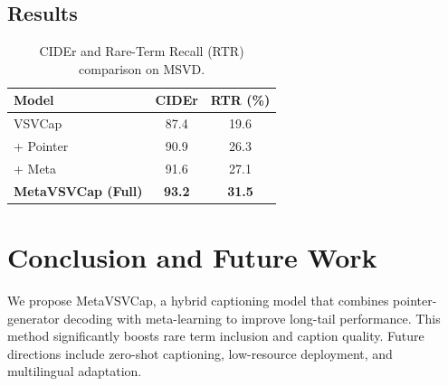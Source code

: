 \documentclass[journal]{IEEEtran}
\begin{document}
\subsection{Results}
\begin{table}[h]
\centering
\caption{CIDEr and Rare-Term Recall (RTR) comparison on MSVD.}
\begin{tabular}{lcc}
\hline
Model & CIDEr & RTR (\%) \\
\hline
VSVCap & 87.4 & 19.6 \\
+ Pointer & 90.9 & 26.3 \\
+ Meta & 91.6 & 27.1 \\
\textbf{MetaVSVCap (Full)} & \textbf{93.2} & \textbf{31.5} \\
\hline
\end{tabular}
\end{table}

\section{Conclusion and Future Work}
We propose MetaVSVCap, a hybrid captioning model that combines pointer-generator decoding with meta-learning to improve long-tail performance. This method significantly boosts rare term inclusion and caption quality. Future directions include zero-shot captioning, low-resource deployment, and multilingual adaptation.
\end{document}
